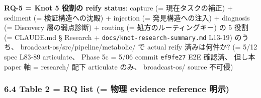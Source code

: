 \documentclass[
]{article}
\begin{document}
\textbf{RQ-5 = Knot 5 役割の reify status}: capture (= 現在タスクの補正)
+ sediment (= 検証構造への沈殿) + injection (= 発見構造への注入) +
diagnosis (= Discovery 層の弱点診断) + routing (=
処方のルーティングキー) の 5 役割 (= CLAUDE.md § Research +
\texttt{docs/knot-research-summary.md} L13-19) のうち、
broadcast-os/src/pipeline/metabolic/ で actual reify 済みは何件か? (=
5/12 spec L83-89 articulate、 Phase 5c = 5/06 commit \texttt{ef9fe27}
E2E 確認済、 但し本 paper 軸 = research/ 配下 articulate のみ、
broadcast-os/ source 不可侵)

\subsubsection{6.4 Table 2 = RQ list (= 物理 evidence reference
明示)}\label{table-2-rq-list-ux7269ux7406-evidence-reference-ux660eux793a}
\end{document}
